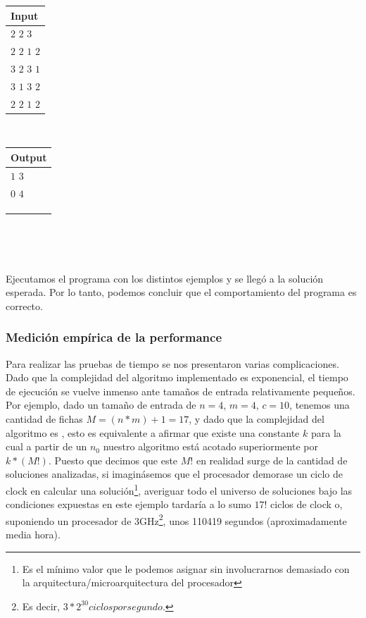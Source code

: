 \documentclass[11pt, a4paper, twoside]{article}
\begin{document}
\begin{itemize}
\begin{itemize}
			\begin{minipage}{0.2\textwidth}
				\begin{tabular}{l}
					Input  \\
					\hline
					$2$ $2$ $3$     \\
					$2$ $2$ $1$ $2$ \\
					$3$ $2$ $3$ $1$ \\
					$3$ $1$ $3$ $2$ \\
					$2$ $2$ $1$ $2$ \\
				\end{tabular} \\  
			\end{minipage}
			\begin{minipage}{0.2\textwidth}	
				\begin{tabular}{l}
					Output  \\
					\hline
					$1$ $3$ \\
					$0$ $4$ \\
					\\
					\\
					\\
				\end{tabular} \\
			\end{minipage} \\
		
	\end{itemize}
		
\end{itemize}

Ejecutamos el programa con los distintos ejemplos y se llegó a la solución esperada. Por lo tanto, podemos concluir que el comportamiento del programa es correcto. 

\subsubsection{Medición empírica de la performance}

Para realizar las pruebas de tiempo se nos presentaron varias complicaciones.
Dado que la complejidad del algoritmo implementado es exponencial, el tiempo de
ejecución se vuelve inmenso ante tamaños de entrada relativamente pequeños. Por
ejemplo, dado un tamaño de entrada de $n=4$, $m=4$, $c=10$, tenemos una cantidad
de fichas $M=(n*m)+1=17$, y dado que la complejidad del algoritmo es ,
esto es equivalente a afirmar que existe una constante $k$ para la cual a partir
de un $n_0$ nuestro algoritmo está acotado superiormente por $k*(M!)$. Puesto
que decimos que este $M!$ en realidad surge de la cantidad de soluciones
analizadas, si imaginásemos que el procesador demorase un ciclo de clock en
calcular una solución\footnote{Es el mínimo valor que le podemos asignar sin
involucrarnos demasiado con la arquitectura/microarquitectura del procesador},
averiguar todo el universo de soluciones bajo las condiciones expuestas en este
ejemplo tardaría a lo sumo $17!$ ciclos de clock o, suponiendo un procesador de
3GHz\footnote{Es decir, $3*2^30 ciclos por segundo.$}, unos 110419 segundos
(aproximadamente media hora).
\end{document}

